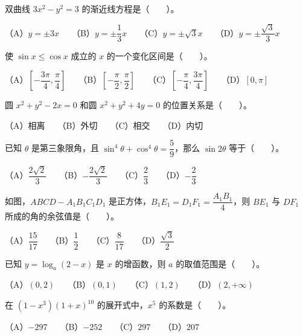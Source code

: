 \begin{question}
双曲线 $3x^2-y^2=3$ 的渐近线方程是\mbox{（　　）}。

（A）$y=\pm3x$　　（B）$y=\pm\dfrac13x$　　（C）$y=\pm\sqrt3x$　　（D）$y=\pm\dfrac{\sqrt3}{3}x$

\end{question}
\begin{question}
使 $\sin x\le\cos x$ 成立的 $x$ 的一个变化区间是\mbox{（　　）}。

（A）$\left[-\dfrac{3\pi}{4},\dfrac\pi4\right]$　　（B）$\left[-\dfrac\pi2,\dfrac\pi2\right]$　　（C）$\left[-\dfrac\pi4,\dfrac{3\pi}{4}\right]$　　（D）$[0,\pi]$

\end{question}
\begin{question}
圆 $x^2+y^2-2x=0$ 和圆 $x^2+y^2+4y=0$ 的位置关系是\mbox{（　　）}。

（A）相离　　（B）外切　　（C）相交　　（D）内切

\end{question}
\begin{question}
已知 $\theta$ 是第三象限角，且 $\sin^4\theta+\cos^4\theta=\dfrac59$，那么 $\sin2\theta$ 等于\mbox{（　　）}。

（A）$\dfrac{2\sqrt2}{3}$　　（B）$-\dfrac{2\sqrt2}{3}$　　（C）$\dfrac23$　　（D）$-\dfrac23$

\Needspace{0.4\textheight}
\end{question}
\begin{question}
如图，$ABCD-A_1B_1C_1D_1$ 是正方体，$B_1E_1=D_1F_1=\dfrac{A_1B_1}{4}$，则 $BE_1$ 与 $DF_1$ 所成的角的余弦值是\mbox{（　　）}。
\nopagebreak[4]
\begin{center}\end{center}
\nopagebreak[4]
（A）$\dfrac{15}{17}$　　（B）$\dfrac12$　　（C）$\dfrac8{17}$　　（D）$\dfrac{\sqrt3}{2}$

\end{question}
\begin{question}
已知 $y=\log_a(2-x)$ 是 $x$ 的增函数，则 $a$ 的取值范围是\mbox{（　　）}。

（A）$(0,2)$　　（B）$(0,1)$　　（C）$(1,2)$　　（D）$(2,+\infty)$

\end{question}
\begin{question}
在 $(1-x^3)(1+x)^{10}$ 的展开式中，$x^5$ 的系数是\mbox{（　　）}。

（A）$-297$　　（B）$-252$　　（C）$297$　　（D）$207$

\end{question}
